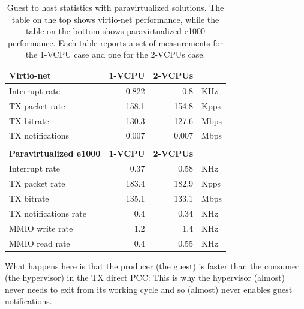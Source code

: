 \begin{table}
\begin{center}
\begin{tabular}{lrrl}
\toprule
\textbf{Virtio-net} & \textbf{1-VCPU} & \textbf{2-VCPUs} & \\
\midrule
Interrupt rate & 0.822 & 0.8 & KHz\\
TX packet rate & 158.1 & 154.8 & Kpps\\
TX bitrate & 130.3 & 127.6 & Mbps\\
TX notifications & 0.007 & 0.007 & Mbps\\
\bottomrule
\\
\toprule
\textbf{Paravirtualized e1000} & \textbf{1-VCPU} & \textbf{2-VCPUs} & \\
\midrule
Interrupt rate & 0.37 & 0.58 & KHz\\
TX packet rate & 183.4 & 182.9 & Kpps\\
TX bitrate & 135.1 & 133.1 & Mbps\\
TX notifications rate & 0.4 & 0.34 & KHz\\
MMIO write rate & 1.2 & 1.4 & KHz\\
MMIO read rate & 0.4 & 0.55 & KHz\\
\bottomrule
\end{tabular}
\end{center}
\caption{Guest to host statistics with paravirtualized solutions. The table on the top shows virtio-net performance, while the table on
	 the bottom shows paravirtualized e1000 performance. Each table reports a set of measurements for the 1-VCPU case and one for
	 the 2-VCPUs case.}
\label{tab:virtionet-tx-g2h1vcpu}
\end{table}

What happens here is that the producer (the guest) is faster than the consumer (the hypervisor) in the TX direct PCC: This is why the 
hypervisor (almost) never needs to exit from its working cycle and so (almost) never enables guest notifications.

\vspace{0.5cm}

